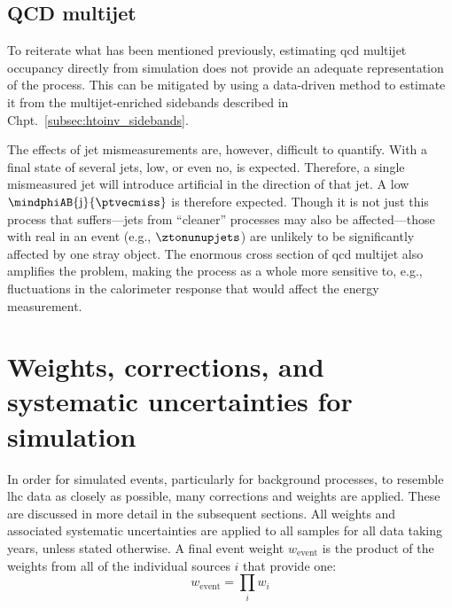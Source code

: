 

\subsection{\texorpdfstring{\ztonunupjets}{Z to nunu + jets}}
\label{subsec:htoinv_znunu_bkg}




\subsection{QCD multijet}
\label{subsec:htoinv_qcd_multijet_bkg}

To reiterate what has been mentioned previously, estimating \acrshort{qcd} multijet occupancy directly from simulation does not provide an adequate representation of the process. This can be mitigated by using a data-driven method to estimate it from the multijet-enriched sidebands described in Chpt.~\ref{subsec:htoinv_sidebands}.

The effects of \gls{jet} mismeasurements are, however, difficult to quantify. With a final state of several \glspl{jet}, low, or even no, \ptmiss is expected. Therefore, a single mismeasured \gls{jet} will introduce artificial \ptvecmiss in the direction of that jet. A low $\mindphiAB{\mathrm{j}}{\ptvecmiss}$ is therefore expected. Though it is not just this process that suffers---\glspl{jet} from ``cleaner'' processes may also be affected---those with real \ptmiss in an event (e.g., $\ztonunupjets$) are unlikely to be significantly affected by one stray object. The enormous cross section of \acrshort{qcd} multijet also amplifies the problem, making the process as a whole more sensitive to, e.g., fluctuations in the calorimeter response that would affect the energy measurement.




\section{Weights, corrections, and systematic uncertainties for simulation}
\label{sec:htoinv_mc_corrections}


In order for simulated events, particularly for background processes, to resemble \acrshort{lhc} data as closely as possible, many corrections and weights are applied. These are discussed in more detail in the subsequent sections. All weights and associated systematic uncertainties are applied to all samples for all data taking years, unless stated otherwise. A final event weight $w_{\mathrm{event}}$ is the product of the weights from all of the individual sources $i$ that provide one:
\begin{equation}
    w_{\mathrm{event}} = \prod_i w_i
    \label{eq:event_weight}
\end{equation}

